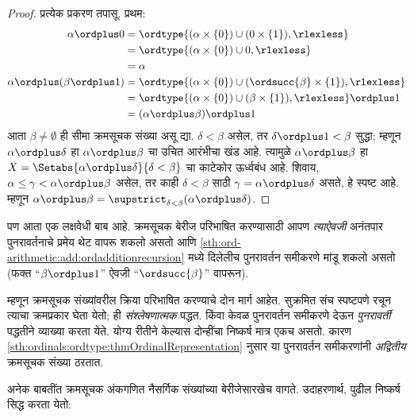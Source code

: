 \begin{proof}
प्रत्येक प्रकरण तपासू. प्रथम:
\begin{align*}
  \alpha \ordplus  0
  & = \ordtype{(\alpha \times \{0\}) \cup (0 \times \{1\}), \rlexless} \\
  &= \ordtype{(\alpha \times \{0\}) \cup 0, \rlexless}\\
  &= \alpha\\
  \alpha \ordplus (\beta \ordplus  1)
  &= \ordtype{(\alpha\times \{0\}) \cup (\ordsucc{\beta}\times \{1\}), \rlexless} \\
  &= \ordtype{(\alpha\times \{0\}) \cup (\beta \times \{1\}), \rlexless} \ordplus 1\\
  &= (\alpha \ordplus  \beta) \ordplus  1
\end{align*}
आता $\beta \neq \emptyset$ ही सीमा क्रमसूचक संख्या असू द्या. $\delta < \beta$ असेल, तर $\delta\ordplus 1 < \beta$ सुद्धा; म्हणून $\alpha \ordplus  \delta$ हा $\alpha \ordplus  \beta$ चा उचित आरंभीचा खंड आहे. त्यामुळे $\alpha
\ordplus  \beta$ हा $X = \Setabs{\alpha
\ordplus  \delta}{\delta < \beta}$ चा काटेकोर ऊर्ध्वबंध आहे. शिवाय, $\alpha \leq \gamma <
\alpha \ordplus  \beta$ असेल, तर काही $\delta < \beta$ साठी $\gamma = \alpha \ordplus
\delta$ असते, हे स्पष्ट आहे. म्हणून $\alpha \ordplus  \beta =
\supstrict_{\delta< \beta}(\alpha\ordplus \delta)$.
\end{proof}

पण आता एक लक्षवेधी बाब आहे. क्रमसूचक बेरीज परिभाषित करण्यासाठी आपण \emph{त्याऐवजी} अनंतपार पुनरावर्तनाचे प्रमेय थेट वापरू शकलो असतो आणि \ref{sth:ord-arithmetic:add:ordadditionrecursion} मध्ये दिलेलीच पुनरावर्तन समीकरणे मांडू शकलो असतो (फक्त “$\beta \ordplus 1$” ऐवजी “$\ordsucc{\beta}$” वापरून).

म्हणून क्रमसूचक संख्यांवरील क्रिया परिभाषित करण्याचे दोन मार्ग आहेत. सुक्रमित संच स्पष्टपणे रचून त्याचा क्रमप्रकार घेता येतो; ही \emph{संश्लेषणात्मक} पद्धत. किंवा केवळ पुनरावर्तन समीकरणे देऊन \emph{पुनरावर्ती} पद्धतीने व्याख्या करता येते. योग्य रीतीने केल्यास दोन्हींचा निष्कर्ष मात्र एकच असतो. कारण \ref{sth:ordinals:ordtype:thmOrdinalRepresentation} नुसार या पुनरावर्तन समीकरणांनी \emph{अद्वितीय} क्रमसूचक संख्या ठरतात.

अनेक बाबतींत क्रमसूचक अंकगणित नैसर्गिक संख्यांच्या बेरीजेसारखेच वागते. उदाहरणार्थ, पुढील निष्कर्ष सिद्ध करता येतो:

